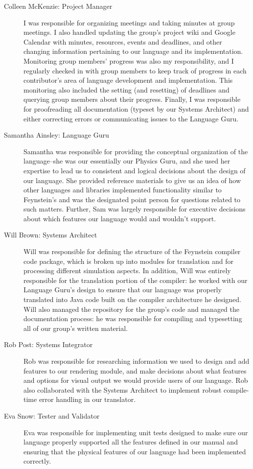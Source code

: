 \begin{description}
\item[Colleen McKenzie: Project Manager] I was responsible for
  organizing meetings and taking minutes at group meetings. I also
  handled updating the group’s project wiki and Google Calendar with
  minutes, resources, events and deadlines, and other changing 
  information pertaining to our language and its
  implementation. Monitoring group members’ progress was also my
  responsibility, and I regularly checked in with group members to
  keep track of progress in each contributor’s area of language
  development and implementation. This monitoring also included the
  setting (and resetting) of deadlines and querying group members
  about their progress. Finally, I was responsible for proofreading
  all documentation (typeset by our Systems Architect) and either 
  correcting errors or communicating issues to the Language Guru.

\item[Samantha Ainsley: Language Guru] Samantha was responsible for
  providing the conceptual organization of the language--she was our
  essentially our Physics Guru, and she used her expertise to lead us
  to consistent and logical decisions about the design of our
  language. She provided reference materials to give us an idea of how
  other languages and libraries implemented functionality similar to
  Feynstein’s and was the designated point person for questions
  related to such matters. Further, Sam was largely responsible for
  executive decisions about which features our language would and
  wouldn’t support.

\item[Will Brown: Systems Architect] Will was responsible for defining
  the structure of the Feynstein compiler code package, which is
  broken up into modules for translation and for processing different
  simulation aspects. In addition, Will was entirely responsible for
  the translation portion of the compiler: he worked with our Language
  Guru’s design to ensure that our language was properly translated
  into Java code built on the compiler architecture he designed. Will
  also managed the repository for the group’s code and managed the
  documentation process: he was responsible for compiling and
  typesetting all of our group's written material.

\item[Rob Post: Systems Integrator] Rob was responsible for
  researching information we used to design and add features to our
  rendering module, and make decisions about what features and options
  for visual output we would provide users of our language. Rob also
  collaborated with the Systems Architect to implement robust
  compile-time error handling in our translator.

\item[Eva Snow: Tester and Validator] Eva was responsible for
  implementing unit tests designed to make sure our language properly
  supported all the features defined in our manual and ensuring that
  the physical features of our language had been implemented
  correctly.
\end{description}

